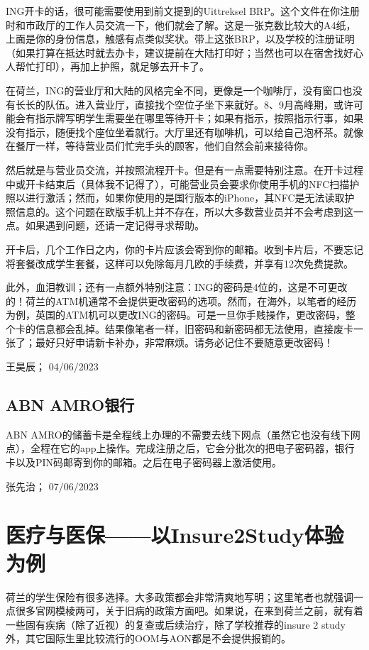 ING开卡的话，很可能需要使用到前文提到的Uittreksel BRP。这个文件在你注册时和市政厅的工作人员交流一下，他们就会了解。这是一张克数比较大的A4纸，上面是你的身份信息，触感有点类似奖状。带上这张BRP，以及学校的注册证明（如果打算在抵达时就去办卡，建议提前在大陆打印好；当然也可以在宿舍找好心人帮忙打印），再加上护照，就足够去开卡了。

在荷兰，ING的营业厅和大陆的风格完全不同，更像是一个咖啡厅，没有窗口也没有长长的队伍。进入营业厅，直接找个空位子坐下来就好。8、9月高峰期，或许可能会有指示牌写明学生需要坐在哪里等待开卡；如果有指示，按照指示行事，如果没有指示，随便找个座位坐着就行。大厅里还有咖啡机，可以给自己泡杯茶。就像在餐厅一样，等待营业员们忙完手头的顾客，他们自然会前来接待你。

然后就是与营业员交流，并按照流程开卡。但是有一点需要特别注意。在开卡过程中或开卡结束后（具体我不记得了），可能营业员会要求你使用手机的NFC扫描护照以进行激活；然而，如果你使用的是国行版本的iPhone，其NFC是无法读取护照信息的。这个问题在欧版手机上并不存在，所以大多数营业员并不会考虑到这一点。如果遇到问题，还请一定记得寻求帮助。

开卡后，几个工作日之内，你的卡片应该会寄到你的邮箱。收到卡片后，不要忘记将套餐改成学生套餐，这样可以免除每月几欧的手续费，并享有12次免费提款。

此外，血泪教训；还有一点额外特别注意：ING的密码是4位的，这是不可更改的！荷兰的ATM机通常不会提供更改密码的选项。然而，在海外，以笔者的经历为例，英国的ATM机可以更改ING的密码。可是一旦你手贱操作，更改密码，整个卡的信息都会乱掉。结果像笔者一样，旧密码和新密码都无法使用，直接废卡一张了；最好只好申请新卡补办，非常麻烦。请务必记住不要随意更改密码！
\begin{flushright}
王昊辰； 04/06/2023
\end{flushright}
\subsection{ABN AMRO银行}
ABN AMRO的储蓄卡是全程线上办理的不需要去线下网点（虽然它也没有线下网点），全程在它的app上操作。完成注册之后，它会分批次的把电子密码器，银行卡以及PIN码邮寄到你的邮箱。之后在电子密码器上激活使用。
\begin{flushright}
张先治； 07/06/2023

\end{flushright}


\vspace{\betsubsec} %
\section{医疗与医保——以Insure2Study体验为例}
荷兰的学生保险有很多选择。大多政策都会非常清爽地写明；这里笔者也就强调一点很多官网模棱两可，关于旧病的政策方面吧。如果说，在来到荷兰之前，就有着一些固有疾病（除了近视）的复查或后续治疗，除了学校推荐的insure 2 study外，其它国际生里比较流行的OOM与AON都是不会提供报销的。

